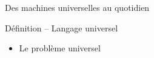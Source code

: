 
\begingroup

\begin{frame}[fragile]{Des machines universelles au quotidien}

  \begin{block}{Définition -- Langage universel}
    \begin{itemize}
    \item Le problème universel 
    \end{itemize}
  \end{block}
  
\end{frame}

\endgroup
\endinput

